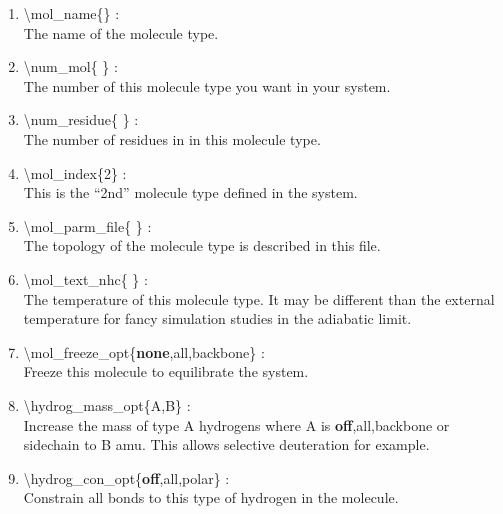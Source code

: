 \documentclass[12pt,titlepage]{article}
\begin{document}
\begin{enumerate}

 \vspace{0.15in} 
 \item  \textbackslash{}mol\_name\{\} : \\
   The name of the molecule type.

 \vspace{0.15in} 
 \item  \textbackslash{}num\_mol\{ \} : \\ 
   The number of this molecule type you want in your system.

 \vspace{0.15in} 
 \item  \textbackslash{}num\_residue\{ \} : \\
   The number of residues in in this molecule type.

 \vspace{0.15in} 
 \item  \textbackslash{}mol\_index\{2\} : \\ 
   This is the ``2nd'' molecule type defined in the system.

 \vspace{0.15in} 
 \item  \textbackslash{}mol\_parm\_file\{ \} : \\
   The topology of the molecule type is described in this file.

 \vspace{0.15in} 
 \item  \textbackslash{}mol\_text\_nhc\{ \} : \\
   The temperature of this molecule type. It may be different than the
   external temperature for fancy simulation studies in the adiabatic limit.

 \vspace{0.15in} 
 \item  \textbackslash{}mol\_freeze\_opt\{{\bf none},all,backbone\} : \\
    Freeze this molecule to equilibrate the system.

 \vspace{0.15in} 
 \item  \textbackslash{}hydrog\_mass\_opt\{A,B\} : \\
   Increase the mass of type A hydrogens where A is 
   {\bf off},all,backbone or sidechain to B amu. This allows
   selective deuteration for example.

 \vspace{0.15in} 
 \item  \textbackslash{}hydrog\_con\_opt\{{\bf off},all,polar\} : \\
   Constrain all bonds to this type of hydrogen in the molecule.


\end{enumerate}
\end{document}
